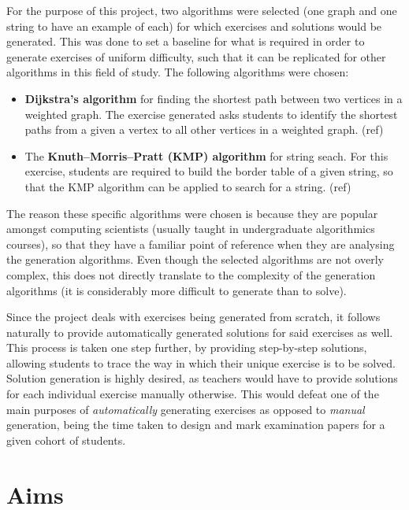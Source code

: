 \documentclass{l4proj}
\begin{document}
For the purpose of this project, two algorithms were selected (one graph and one string to have an example of each) for which exercises and solutions would be generated. This was done to set a baseline for what is required in order to generate exercises of uniform difficulty, such that it can be replicated for other algorithms in this field of study. The following algorithms were chosen:
\begin{itemize}
	\item
	\textbf{Dijkstra's algorithm} for finding the shortest path between two vertices in a weighted graph. The exercise generated asks students to identify the shortest paths from a given a vertex to all other vertices in a weighted graph. (ref)
	\item
	The \textbf{Knuth–Morris–Pratt (KMP) algorithm} for string seach. For this exercise, students are required to build the border table of a given string, so that the KMP algorithm can be applied to search for a string. (ref)
\end{itemize}
The reason these specific algorithms were chosen is because they are popular amongst computing scientists (usually taught in undergraduate algorithmics courses), so that they have a familiar point of reference when they are analysing the generation algorithms. Even though the selected algorithms are not overly complex, this does not directly translate to the complexity of the generation algorithms (it is considerably more difficult to generate than to solve). 

Since the project deals with exercises being generated from scratch, it follows naturally to provide automatically generated solutions for said exercises as well. This process is taken one step further, by providing step-by-step solutions, allowing students to trace the way in which their unique exercise is to be solved. Solution generation is highly desired, as teachers would have to provide solutions for each individual exercise manually otherwise. This would defeat one of the main purposes of \emph{automatically} generating exercises as opposed to \emph{manual} generation, being the time taken to design and mark examination papers for a given cohort of students.

\section{Aims}
\label{sec:aim}
\end{document}
